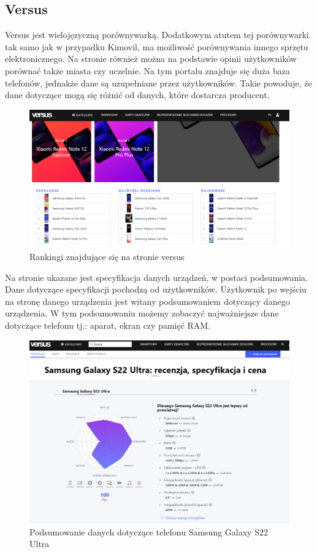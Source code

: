 \subsection{Versus}
Versus \cite{versus} jest wielojęzyczną porównywarką. Dodatkowym atutem tej porównywarki tak samo jak w przypadku Kimovil, ma możliwość porównywania innego sprzętu elektronicznego. Na stronie również można na podstawie opinii użytkowników porównać także miasta czy uczelnie. 
Na tym portalu znajduje się duża baza telefonów, jednakże dane są uzupełniane przez użytkowników. Takie powoduje, że dane dotyczące mogą się różnić od danych, które dostarcza producent.
\begin{figure}[H]
    \centering
    \includegraphics[width=15cm]{img/versus/versusRankingi.png}
    \caption{Rankingi znajdujące się na stronie versus}
    \label{versus_1}
\end{figure}
Na stronie ukazane jest specyfikacja danych urządzeń, w postaci podsumowania. Dane dotyczące specyfikacji pochodzą od użytkowników. Użytkownik po wejściu na stronę danego urządzenia jest witany podsumowaniem dotyczący danego urządzenia. W tym podsumowaniu możemy zobaczyć najważniejsze dane dotyczące telefonu tj.: aparat, ekran czy pamięć RAM.
\begin{figure}[H]
    \centering
    \includegraphics[width=15cm]{img/versus/versusDetails.png}
    \caption{Podsumowanie danych dotyczące telefonu Samsung Galaxy S22 Ultra}
    \label{versus_2}
\end{figure}
